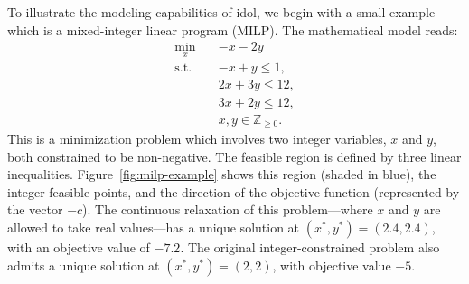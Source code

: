 \label{sec:milp-example}

To illustrate the modeling capabilities of \textsf{idol}, we begin with a
small example which is a mixed-integer linear program (MILP). 
%
The mathematical model reads:
\begin{subequations}
    \label{eq:milp-example}
    \begin{align}
        \min_x \quad & -x - 2y \\
        \text{s.t.} & -x + y \le 1, \\
        & 2x + 3y \le 12, \\
        & 3x + 2y \le 12, \\
        & x,y\in\mathbb{Z}_{\ge 0}.
    \end{align}
\end{subequations}
This is a minimization problem which involves two integer variables, $x$ and
$y$, both constrained to be non-negative. The feasible region is defined by
three linear inequalities. Figure~\ref{fig:milp-example} shows this region
(shaded in blue), the integer-feasible points, and the direction of the
objective function (represented by the vector $-c$).
%
The continuous relaxation of this problem---where $x$ and $y$ are allowed to
take real values---has a unique solution at $(x^*, y^*) = (2.4, 2.4)$, with an
objective value of $-7.2$. The original integer-constrained problem also
admits a unique solution at $(x^*, y^*) = (2, 2)$, with objective value $-5$.

\newcommand{\drawPoint}[2]{\filldraw[orange] (#1,#2) circle (1.5pt) node[anchor=north west] {};}

